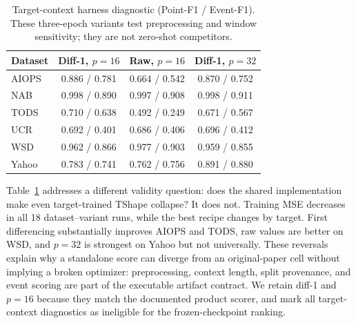 \documentclass[conference]{IEEEtran}
\begin{document}
\begin{table}[t]
\caption{Target-context harness diagnostic (Point-F1 / Event-F1). These three-epoch variants test preprocessing and window sensitivity; they are not zero-shot competitors.}
\label{tab:harness-diagnostic}
\centering
\scriptsize
\setlength{\tabcolsep}{2.5pt}
\begin{tabular}{lccc}
\toprule
Dataset & Diff-1, $p=16$ & Raw, $p=16$ & Diff-1, $p=32$ \\
\midrule
AIOPS & 0.886 / 0.781 & 0.664 / 0.542 & 0.870 / 0.752 \\
NAB   & 0.998 / 0.890 & 0.997 / 0.908 & 0.998 / 0.911 \\
TODS  & 0.710 / 0.638 & 0.492 / 0.249 & 0.671 / 0.567 \\
UCR   & 0.692 / 0.401 & 0.686 / 0.406 & 0.696 / 0.412 \\
WSD   & 0.962 / 0.866 & 0.977 / 0.903 & 0.959 / 0.855 \\
Yahoo & 0.783 / 0.741 & 0.762 / 0.756 & 0.891 / 0.880 \\
\bottomrule
\end{tabular}
\end{table}

Table~\ref{tab:harness-diagnostic} addresses a different validity question: does the shared implementation make even target-trained TShape collapse? It does not. Training MSE decreases in all 18 dataset--variant runs, while the best recipe changes by target. First differencing substantially improves AIOPS and TODS, raw values are better on WSD, and $p=32$ is strongest on Yahoo but not universally. These reversals explain why a standalone score can diverge from an original-paper cell without implying a broken optimizer: preprocessing, context length, split provenance, and event scoring are part of the executable artifact contract. We retain diff-1 and $p=16$ because they match the documented product scorer, and mark all target-context diagnostics as ineligible for the frozen-checkpoint ranking.
\end{document}
